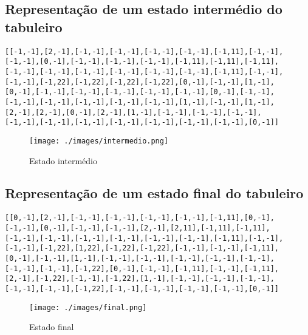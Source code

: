 \documentclass[a4paper]{article}
\begin{document}
\subsection{Representação de um estado intermédio do tabuleiro}

\begin{small}
\begin{lstlisting}
[[-1,-1],[2,-1],[-1,-1],[-1,-1],[-1,-1],[-1,-1],[-1,11],[-1,-1],
[-1,-1],[0,-1],[-1,-1],[-1,-1],[-1,-1],[-1,11],[-1,11],[-1,11],
[-1,-1],[-1,-1],[-1,-1],[-1,-1],[-1,-1],[-1,-1],[-1,11],[-1,-1],
[-1,-1],[-1,22],[-1,22],[-1,22],[-1,22],[0,-1],[-1,-1],[1,-1],
[0,-1],[-1,-1],[-1,-1],[-1,-1],[-1,-1],[-1,-1],[0,-1],[-1,-1],
[-1,-1],[-1,-1],[-1,-1],[-1,-1],[-1,-1],[1,-1],[-1,-1],[1,-1],
[2,-1],[2,-1],[0,-1],[2,-1],[1,-1],[-1,-1],[-1,-1],[-1,-1],
[-1,-1],[-1,-1],[-1,-1],[-1,-1],[-1,-1],[-1,-1],[-1,-1],[0,-1]]
\end{lstlisting}
\end{small}

\begin{figure}[h!]
	\begin{center}
		\texttt{[image: ./images/intermedio.png]}
		\caption{Estado intermédio}
		\label{fig:6}
	\end{center}
\end{figure}

\subsection{Representação de um estado final do tabuleiro}

\begin{small}
\begin{lstlisting}
[[0,-1],[2,-1],[-1,-1],[-1,-1],[-1,-1],[-1,-1],[-1,11],[0,-1],
[-1,-1],[0,-1],[-1,-1],[-1,-1],[2,-1],[2,11],[-1,11],[-1,11],
[-1,-1],[-1,-1],[-1,-1],[-1,-1],[-1,-1],[-1,-1],[-1,11],[-1,-1],
[-1,-1],[-1,22],[1,22],[-1,22],[-1,22],[-1,-1],[-1,-1],[-1,11],
[0,-1],[-1,-1],[1,-1],[-1,-1],[-1,-1],[-1,-1],[-1,-1],[-1,-1],
[-1,-1],[-1,-1],[-1,22],[0,-1],[-1,-1],[-1,11],[-1,-1],[-1,11],
[2,-1],[-1,22],[-1,-1],[-1,22],[1,-1],[-1,-1],[-1,-1],[-1,-1],
[-1,-1],[-1,-1],[-1,22],[-1,-1],[-1,-1],[-1,-1],[-1,-1],[0,-1]]
\end{lstlisting}
\end{small}

\begin{figure}[h!]
	\begin{center}
		\texttt{[image: ./images/final.png]}
		\caption{Estado final}
		\label{fig:7}
	\end{center}
\end{figure}
\end{document}
